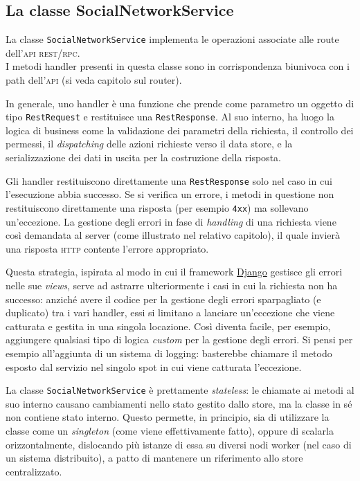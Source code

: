 \documentclass[a4paper,8pt]{article} %
\def\code#1{\texttt{#1}}
\begin{document}
\subsection{La classe SocialNetworkService}
La classe \code{SocialNetworkService} implementa le operazioni associate alle route dell'\textsc{api} \textsc{rest}/\textsc{rpc}.\\ I metodi handler presenti in questa classe
sono in corrispondenza biunivoca con i path dell'\textsc{api} (si veda capitolo sul router).

\par In generale, uno handler è una funzione che prende come parametro un oggetto di tipo \code{RestRequest} e restituisce una \code{RestResponse}. Al suo interno,
ha luogo la logica di business come la validazione dei parametri della richiesta, il controllo dei permessi, il \emph{dispatching} delle azioni richieste verso il data store, e la
serializzazione dei dati in uscita per la costruzione della risposta.

\par Gli handler restituiscono direttamente una \code{RestResponse} solo nel caso in cui l'esecuzione abbia successo. Se si verifica un errore, i metodi in questione non restituiscono
direttamente una risposta (per esempio \code{4xx}) ma sollevano un'eccezione. La gestione degli errori in fase di \emph{handling} di una richiesta viene così demandata
al server (come illustrato nel relativo capitolo), il quale invierà una risposta \textsc{\textsc{http}} contente l'errore appropriato.
\par Questa strategia, ispirata al modo in cui il framework \href{https://www.djangoproject.com/}{Django} gestisce gli errori nelle sue \emph{views}, serve ad astrarre ulteriormente i casi in cui la richiesta non ha successo:
anziché avere il codice per la gestione degli errori sparpagliato (e duplicato) tra i vari handler, essi si limitano a lanciare un'eccezione che viene catturata e gestita in una singola locazione.
Così diventa
facile, per esempio, aggiungere qualsiasi tipo di logica \emph{custom} per la gestione degli errori. Si pensi per esempio all'aggiunta di un sistema di logging: basterebbe chiamare il metodo esposto dal servizio nel singolo spot in cui
viene catturata l'eccezione.

\par La classe \code{SocialNetworkService} è prettamente \emph{stateless}: le chiamate ai metodi al suo interno causano cambiamenti nello stato gestito dallo store, ma la classe
in sé non contiene stato interno. Questo permette, in principio, sia di utilizzare la classe come un \emph{singleton} (come viene effettivamente fatto), oppure di scalarla
orizzontalmente, dislocando più istanze di essa su diversi nodi worker (nel caso di un sistema distribuito), a patto di mantenere un riferimento allo store centralizzato.
\end{document}
